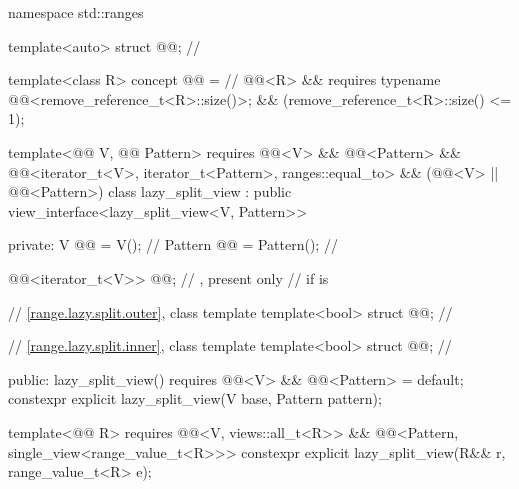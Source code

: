%
%
%
%
\begin{codeblock}
namespace std::ranges {
  template<auto> struct @@;                       // \expos

  template<class R>
  concept @@ =                                          // \expos
    @@<R> &&
    requires { typename @@<remove_reference_t<R>::size()>; } &&
    (remove_reference_t<R>::size() <= 1);

  template<@@ V, @@ Pattern>
    requires @@<V> && @@<Pattern> &&
             @@<iterator_t<V>, iterator_t<Pattern>, ranges::equal_to> &&
             (@@<V> || @@<Pattern>)
  class lazy_split_view : public view_interface<lazy_split_view<V, Pattern>> {
  private:
    V @@ = V();                                              // \expos
    Pattern @@ = Pattern();                               // \expos

    @@<iterator_t<V>> @@;              // \expos, present only
                                                                // if  is 

    // \ref{range.lazy.split.outer}, class template 
    template<bool> struct @@;                       // \expos

    // \ref{range.lazy.split.inner}, class template 
    template<bool> struct @@;                       // \expos

  public:
    lazy_split_view()
      requires @@<V> && @@<Pattern> = default;
    constexpr explicit lazy_split_view(V base, Pattern pattern);

    template<@@ R>
      requires @@<V, views::all_t<R>> &&
               @@<Pattern, single_view<range_value_t<R>>>
    constexpr explicit lazy_split_view(R&& r, range_value_t<R> e);

}}
\end{codeblock}
